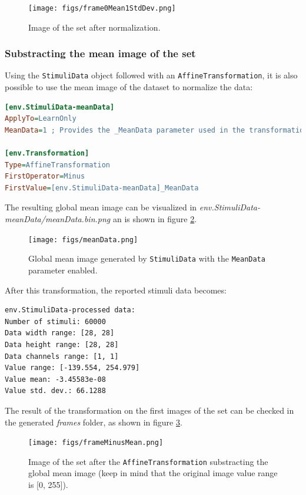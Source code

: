 \documentclass[a4paper,11pt,oneside]{article}
\begin{document}
\begin{figure}[!htb]
  \centering
  \texttt{[image: figs/frame0Mean1StdDev.png]}
  \caption{Image of the set after normalization.}
  \label{fig:frame0Mean1StdDev}
\end{figure}


\subsubsection{Substracting the mean image of the set}

Using the \lstinline!StimuliData! object followed with an
\lstinline!AffineTransformation!, it is also possible to use the mean image of
 the dataset to normalize the data:
\begin{lstlisting}[language=ini]
[env.StimuliData-meanData]
ApplyTo=LearnOnly
MeanData=1 ; Provides the _MeanData parameter used in the transformation

[env.Transformation]
Type=AffineTransformation
FirstOperator=Minus
FirstValue=[env.StimuliData-meanData]_MeanData
\end{lstlisting}

The resulting global mean image can be visualized in
 \emph{env.StimuliData-meanData/meanData.bin.png} an is shown in figure
 \ref{fig:meanData}.

\begin{figure}[ht!]
  \centering
  \texttt{[image: figs/meanData.png]}
  \caption{Global mean image generated by \lstinline!StimuliData! with
  the \lstinline!MeanData! parameter enabled.}
  \label{fig:meanData}
\end{figure}

After this transformation, the reported stimuli data becomes:
\begin{lstlisting}[style=console]
env.StimuliData-processed data:
Number of stimuli: 60000
Data width range: [28, 28]
Data height range: [28, 28]
Data channels range: [1, 1]
Value range: [-139.554, 254.979]
Value mean: -3.45583e-08
Value std. dev.: 66.1288
\end{lstlisting}

The result of the transformation on the first images of the set can be checked
 in the generated \emph{frames} folder, as shown in figure
  \ref{fig:frameMinusMean}.

\begin{figure}[!htb]
  \centering
  \texttt{[image: figs/frameMinusMean.png]}
  \caption{Image of the set after the \lstinline!AffineTransformation!
  substracting the global mean image (keep in mind that the original image
  value range is [0, 255]).}
  \label{fig:frameMinusMean}
\end{figure}
\end{document}
